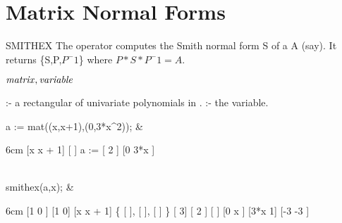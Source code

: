 \newpage
\section{Matrix Normal Forms}

\begin{Operator}[smithex]{SMITHEX}
The operator  computes the Smith normal form S of a
 A (say). It returns \{S,P,$P^-1$\} where $P*S*P^-1 = A$.

\begin{Syntax}
\(\meta{matrix},\meta{variable}\)

 :- a rectangular  of univariate polynomials in 
                 .
 :- the variable.
\end{Syntax}

\begin{Examples}
 a := mat((x,x+1),(0,3*x^2)); &
\begin{multilineoutput}{6cm}
      [x  x + 1]
      [        ]
 a := [      2 ]
      [0  3*x  ]
\end{multilineoutput}\\

 smithex(a,x); &
\begin{multilineoutput}{6cm}
   [1  0 ]    [1    0]    [x   x + 1]
\{  [     ],   [      ],   [         ]  \}
   [    3]    [   2  ]    [         ]
   [0  x ]    [3*x  1]    [-3    -3 ]
\end{multilineoutput}\\
\end{Examples}
\end{Operator}


